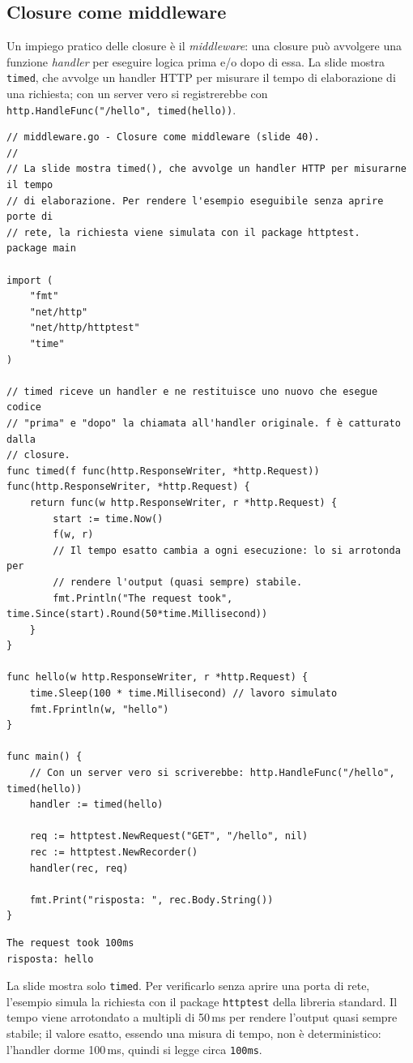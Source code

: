 \documentclass[11pt,a4paper]{report}
\newcommand{\cod}[1]{\texttt{#1}}
\begin{document}
\subsection{Closure come middleware}\label{sec:funzioni-middleware}

Un impiego pratico delle closure è il \emph{middleware}: una closure può
avvolgere una funzione \emph{handler} per eseguire logica prima e/o dopo di essa.
La slide mostra \cod{timed}, che avvolge un handler HTTP per misurare il tempo
di elaborazione di una richiesta; con un server vero si registrerebbe
con \cod{http.HandleFunc("/hello", timed(hello))}.

\begin{lstlisting}[style=gocode,caption={\texttt{02\_functions/middleware.go}}]
// middleware.go - Closure come middleware (slide 40).
//
// La slide mostra timed(), che avvolge un handler HTTP per misurarne il tempo
// di elaborazione. Per rendere l'esempio eseguibile senza aprire porte di
// rete, la richiesta viene simulata con il package httptest.
package main

import (
	"fmt"
	"net/http"
	"net/http/httptest"
	"time"
)

// timed riceve un handler e ne restituisce uno nuovo che esegue codice
// "prima" e "dopo" la chiamata all'handler originale. f è catturato dalla
// closure.
func timed(f func(http.ResponseWriter, *http.Request)) func(http.ResponseWriter, *http.Request) {
	return func(w http.ResponseWriter, r *http.Request) {
		start := time.Now()
		f(w, r)
		// Il tempo esatto cambia a ogni esecuzione: lo si arrotonda per
		// rendere l'output (quasi sempre) stabile.
		fmt.Println("The request took", time.Since(start).Round(50*time.Millisecond))
	}
}

func hello(w http.ResponseWriter, r *http.Request) {
	time.Sleep(100 * time.Millisecond) // lavoro simulato
	fmt.Fprintln(w, "hello")
}

func main() {
	// Con un server vero si scriverebbe: http.HandleFunc("/hello", timed(hello))
	handler := timed(hello)

	req := httptest.NewRequest("GET", "/hello", nil)
	rec := httptest.NewRecorder()
	handler(rec, req)

	fmt.Print("risposta: ", rec.Body.String())
}
\end{lstlisting}
\begin{lstlisting}[style=output]
The request took 100ms
risposta: hello
\end{lstlisting}

\begin{nota}
La slide mostra solo \cod{timed}. Per verificarlo senza aprire una porta di rete,
l'esempio simula la richiesta con il package \cod{httptest} della libreria standard.
Il tempo viene arrotondato a multipli di 50\,ms per rendere l'output quasi
sempre stabile; il valore esatto, essendo una misura di tempo, non è
deterministico: l'handler dorme 100\,ms, quindi si legge circa \cod{100ms}.
\end{nota}
\end{document}
